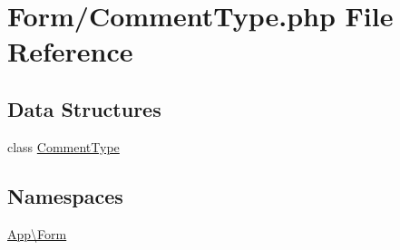 \hypertarget{_comment_type_8php}{}\section{Form/\+Comment\+Type.php File Reference}
\label{_comment_type_8php}
\subsection*{Data Structures}
\begin{DoxyCompactItemize}
\item 
class \mbox{\hyperlink{class_app_1_1_form_1_1_comment_type}{Comment\+Type}}
\end{DoxyCompactItemize}
\subsection*{Namespaces}
\begin{DoxyCompactItemize}
\item 
 \mbox{\hyperlink{namespace_app_1_1_form}{App\textbackslash{}\+Form}}
\end{DoxyCompactItemize}
